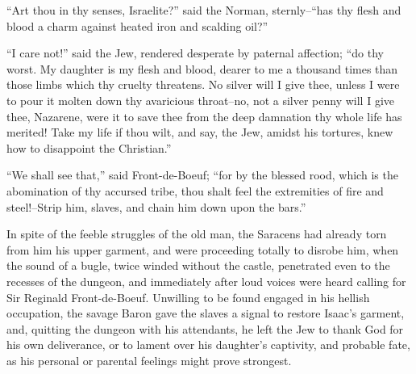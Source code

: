 ``Art thou in thy senses, Israelite?'' said the Norman, sternly--``has
thy flesh and blood a charm against heated iron and scalding oil?''

``I care not!'' said the Jew, rendered desperate by paternal affection;
``do thy worst. My daughter is my flesh and blood, dearer to me a
thousand times than those limbs which thy cruelty threatens. No silver
will I give thee, unless I were to pour it molten down thy avaricious
throat--no, not a silver penny will I give thee, Nazarene, were it to
save thee from the deep damnation thy whole life has merited! Take my
life if thou wilt, and say, the Jew, amidst his tortures, knew how to
disappoint the Christian.''

``We shall see that,'' said Front-de-Boeuf; ``for by the blessed rood,
which is the abomination of thy accursed tribe, thou shalt feel the
extremities of fire and steel!--Strip him, slaves, and chain him down
upon the bars.''

In spite of the feeble struggles of the old man, the Saracens had
already torn from him his upper garment, and were proceeding totally to
disrobe him, when the sound of a bugle, twice winded without the castle,
penetrated even to the recesses of the dungeon, and immediately after
loud voices were heard calling for Sir Reginald Front-de-Boeuf.
Unwilling to be found engaged in his hellish occupation, the savage
Baron gave the slaves a signal to restore Isaac's garment, and, quitting
the dungeon with his attendants, he left the Jew to thank God for his
own deliverance, or to lament over his daughter's captivity, and
probable fate, as his personal or parental feelings might prove
strongest.
